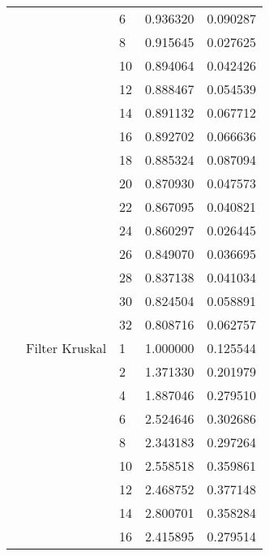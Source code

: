 \begin{tabular}{lllrr}
                       &                    & 6  &  0.936320 &  0.090287 \\
                       &                    & 8  &  0.915645 &  0.027625 \\
                       &                    & 10 &  0.894064 &  0.042426 \\
                       &                    & 12 &  0.888467 &  0.054539 \\
                       &                    & 14 &  0.891132 &  0.067712 \\
                       &                    & 16 &  0.892702 &  0.066636 \\
                       &                    & 18 &  0.885324 &  0.087094 \\
                       &                    & 20 &  0.870930 &  0.047573 \\
                       &                    & 22 &  0.867095 &  0.040821 \\
                       &                    & 24 &  0.860297 &  0.026445 \\
                       &                    & 26 &  0.849070 &  0.036695 \\
                       &                    & 28 &  0.837138 &  0.041034 \\
                       &                    & 30 &  0.824504 &  0.058891 \\
                       &                    & 32 &  0.808716 &  0.062757 \\
                       & Filter Kruskal & 1  &  1.000000 &  0.125544 \\
                       &                    & 2  &  1.371330 &  0.201979 \\
                       &                    & 4  &  1.887046 &  0.279510 \\
                       &                    & 6  &  2.524646 &  0.302686 \\
                       &                    & 8  &  2.343183 &  0.297264 \\
                       &                    & 10 &  2.558518 &  0.359861 \\
                       &                    & 12 &  2.468752 &  0.377148 \\
                       &                    & 14 &  2.800701 &  0.358284 \\
                       &                    & 16 &  2.415895 &  0.279514 \\

\end{tabular}

